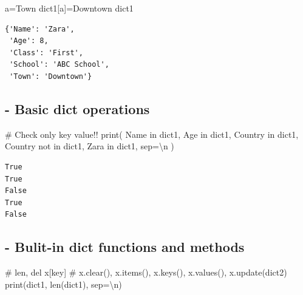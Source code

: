 \documentclass[
  letterpaper,
  DIV=11,
  numbers=noendperiod]{scrreprt}
\newenvironment{Shaded}{\begin{snugshade}}{\end{snugshade}}
\newcommand{\BuiltInTok}[1]{\textcolor[rgb]{0.00,0.23,0.31}{#1}}
\newcommand{\CharTok}[1]{\textcolor[rgb]{0.13,0.47,0.30}{#1}}
\newcommand{\CommentTok}[1]{\textcolor[rgb]{0.37,0.37,0.37}{#1}}
\newcommand{\KeywordTok}[1]{\textcolor[rgb]{0.00,0.23,0.31}{#1}}
\newcommand{\NormalTok}[1]{\textcolor[rgb]{0.00,0.23,0.31}{#1}}
\newcommand{\OperatorTok}[1]{\textcolor[rgb]{0.37,0.37,0.37}{#1}}
\newcommand{\StringTok}[1]{\textcolor[rgb]{0.13,0.47,0.30}{#1}}
\begin{document}
\begin{Shaded}
\begin{Highlighting}[]
\NormalTok{a}\OperatorTok{=}\StringTok{\textquotesingle{}Town\textquotesingle{}}
\NormalTok{dict1[a]}\OperatorTok{=}\StringTok{\textquotesingle{}Downtown\textquotesingle{}}
\NormalTok{dict1}
\end{Highlighting}
\end{Shaded}

\begin{verbatim}
{'Name': 'Zara',
 'Age': 8,
 'Class': 'First',
 'School': 'ABC School',
 'Town': 'Downtown'}
\end{verbatim}

\subsection{- Basic dict operations}\label{basic-dict-operations}

\begin{Shaded}
\begin{Highlighting}[]
\CommentTok{\# Check only key value!!}
\BuiltInTok{print}\NormalTok{(}
    \StringTok{\textquotesingle{}Name\textquotesingle{}} \KeywordTok{in}\NormalTok{ dict1,}
    \StringTok{\textquotesingle{}Age\textquotesingle{}} \KeywordTok{in}\NormalTok{ dict1,}
    \StringTok{\textquotesingle{}Country\textquotesingle{}} \KeywordTok{in}\NormalTok{ dict1,}
    \StringTok{\textquotesingle{}Country\textquotesingle{}} \KeywordTok{not} \KeywordTok{in}\NormalTok{ dict1,}
    \StringTok{\textquotesingle{}Zara\textquotesingle{}} \KeywordTok{in}\NormalTok{ dict1,}
\NormalTok{    sep}\OperatorTok{=}\StringTok{\textquotesingle{}}\CharTok{\textbackslash{}n}\StringTok{\textquotesingle{}}
\NormalTok{)}
\end{Highlighting}
\end{Shaded}

\begin{verbatim}
True
True
False
True
False
\end{verbatim}

\subsection{- Bulit-in dict functions and
methods}\label{bulit-in-dict-functions-and-methods}

\begin{Shaded}
\begin{Highlighting}[]
\CommentTok{\# len, del x[key]}
\CommentTok{\# x.clear(), x.items(), x.keys(), x.values(), x.update(dict2)}
\BuiltInTok{print}\NormalTok{(dict1, }\BuiltInTok{len}\NormalTok{(dict1), sep}\OperatorTok{=}\StringTok{\textquotesingle{}}\CharTok{\textbackslash{}n}\StringTok{\textquotesingle{}}\NormalTok{)}
\end{Highlighting}
\end{Shaded}
\end{document}
